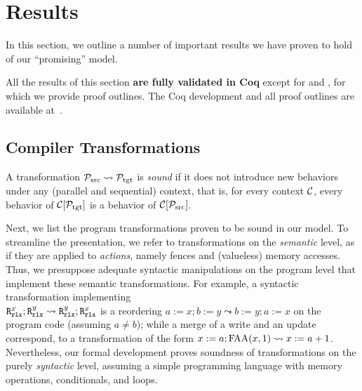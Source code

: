 \section{Results}
\label{sec:results}

In this section, we outline a number of important results we have
proven to hold of our ``promising'' model.


All the results of this section \textbf{are fully validated in Coq}
except for  and
, for which we provide proof outlines.
The {Coq} development and all proof outlines are available at~\cite{kang-phd-thesis-web}.

\subsection{Compiler Transformations}
\label{sec:transformations}

A transformation $\mathcal{P}_\text{src} \leadsto \mathcal{P}_\text{tgt}$ is \emph{sound} 
if it does not introduce new behaviors under any (parallel and sequential) context, that is, 
for every context ${\cal C}$,
every behavior of ${\cal C}[\mathcal{P}_\text{tgt}]$ is a behavior of ${\cal C}[\mathcal{P}_\text{src}]$.

Next, we list the program transformations proven to be sound in our model.
To streamline the presentation, we refer to transformations on the \emph{semantic} level, 
as if they are applied to \emph{actions}, namely fences and (valueless) memory accesses.
Thus, we presuppose adequate syntactic manipulations on the program level
that implement these semantic transformations.
For example, a syntactic transformation implementing \\
${\texttt{R}^x_{\texttt{rlx}};\texttt{R}^y_{\texttt{rlx}} \leadsto \texttt{R}^y_{\texttt{rlx}};\texttt{R}^x_{\texttt{rlx}}}$
is a reordering ${a:=x; b:=y \leadsto b:=y; a:=x}$
on the program code (assuming $a \neq b$);
while a merge of a write and an update correspond, \eg  to a transformation
of the form $x:=a;\textrm{FAA}({x,1})  \leadsto  x:=a+1$.
Nevertheless, our formal development
proves soundness of transformations on the purely \emph{syntactic} level, assuming a simple programming language with memory operations, conditionals, and loops.



